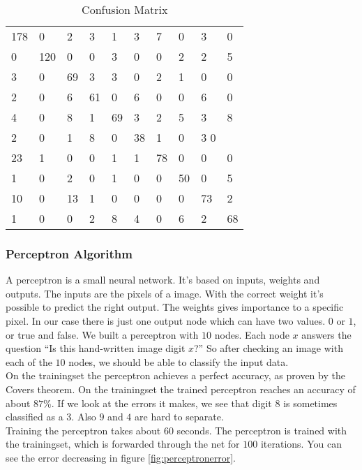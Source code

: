 \documentclass{article}
\begin{document}
\begin{table}[H]
	\begin{center}
		\begin{tabular}{llllllllll}
				178 & 0 & 2 & 3 & 1 & 3 & 7 & 0 & 3 & 0 \\
				0 & 120 & 0 & 0 & 3 & 0 & 0 & 2 & 2 & 5 \\
				3 & 0 & 69 & 3 & 3 & 0 & 2 & 1 & 0 & 0 \\
				2 & 0 & 6 & 61 & 0 & 6 & 0 & 0 & 6 & 0 \\
				4 & 0 & 8 & 1 & 69 & 3 & 2 & 5 & 3 & 8 \\
				2 & 0 & 1 & 8 & 0 & 38 & 1 & 0 & 3 0 \\
				23 & 1 & 0 & 0 & 1 & 1 & 78 & 0 & 0 & 0 \\
				1 & 0 & 2 & 0 & 1 & 0 & 0 & 50 & 0 & 5 \\
				10 & 0 & 13 & 1 & 0 & 0 & 0 & 0 & 73 & 2 \\
				1 & 0 & 0 & 2 & 8 & 4 & 0 & 6 & 2 & 68 \\
		\end{tabular}
	\end{center}
	\caption{Confusion Matrix}
	\label{tab:cm}
\end{table}

\subsubsection{Perceptron Algorithm}
A perceptron is a small neural network. It's based on inputs, weights and outputs. The inputs are the pixels of a image. With the correct weight it's possible to predict the right output. The weights gives importance to a specific pixel. In our case there is just one output node which can have two values. $0$ or $1$, or true and false. We built a perceptron with $10$ nodes. Each node $x$ answers the question ``Is this hand-written image digit $x$?'' So after checking an image with each of the $10$ nodes, we should be able to classify the input data.\\

On the trainingset the perceptron achieves a perfect accuracy, as proven by the Covers theorem. On the trainingset the trained perceptron reaches an accuracy of about $87$\%. If we look at the errors it makes, we see that digit $8$ is sometimes classified as a $3$. Also $9$ and $4$ are hard to separate.\\

Training the perceptron takes about $60$ seconds. The perceptron is trained with the trainingset, which is forwarded through the net for $100$ iterations. You can see the error decreasing in figure \ref{fig:perceptronerror}.\\
\end{document}

